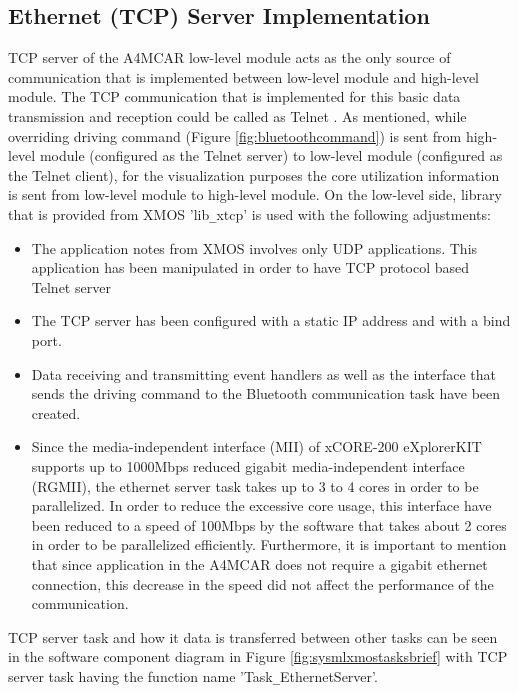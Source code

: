 \subsection{Ethernet (TCP) Server Implementation} \label{llethsection}
TCP server of the A4MCAR low-level module acts as the only source of communication that is implemented between low-level module and high-level module. The TCP communication that is implemented for this basic data transmission and reception could be called as Telnet \cite{telnet}. As mentioned, while overriding driving command (Figure \ref{fig:bluetoothcommand}) is sent from high-level module (configured as the Telnet server) to low-level module (configured as the Telnet client), for the visualization purposes the core utilization information is sent from low-level module to high-level module. On the low-level side, library that is provided from XMOS 'lib\texttt{\_}xtcp' is used with the following adjustments:
\begin{itemize}
	\item The application notes from XMOS involves only UDP applications. This application has been manipulated in order to have TCP protocol based Telnet server
	\item The TCP server has been configured with a static IP address and with a bind port.
	\item Data receiving and transmitting event handlers as well as the interface that sends the driving command to the Bluetooth communication task have been created.
	\item Since the media-independent interface (MII) of xCORE-200 eXplorerKIT supports up to 1000Mbps reduced gigabit media-independent interface (RGMII), the ethernet server task takes up to 3 to 4 cores in order to be parallelized. In order to reduce the excessive core usage, this interface have been reduced to a speed of 100Mbps by the software that takes about 2 cores in order to be parallelized efficiently. Furthermore, it is important to mention that since application in the A4MCAR does not require a gigabit ethernet connection, this decrease in the speed did not affect the performance of the communication.
\end{itemize}

TCP server task and how it data is transferred between other tasks can be seen in the software component diagram in Figure \ref{fig:sysmlxmostasksbrief} with TCP server task having the function name 'Task\texttt{\_}EthernetServer'.


